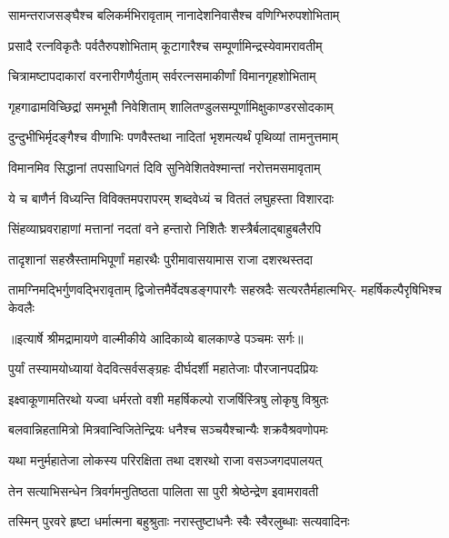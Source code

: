 \twolineshloka
{सामन्तराजसङ्घैश्च बलिकर्मभिरावृताम्}
{नानादेशनिवासैश्च वणिग्भिरुपशोभिताम्} %

\twolineshloka
{प्रसादै रत्नविकृतैः पर्वतैरुपशोभिताम्}
{कूटागारैश्च सम्पूर्णामिन्द्रस्येवामरावतीम्} %

\twolineshloka
{चित्रामष्टापदाकारां वरनारीगणैर्युताम्}
{सर्वरत्नसमाकीर्णां विमानगृहशोभिताम्} %

\twolineshloka
{गृहगाढामविच्छिद्रां समभूमौ निवेशिताम्}
{शालितण्डुलसम्पूर्णामिक्षुकाण्डरसोदकाम्} %

\twolineshloka
{दुन्दुभीभिर्मृदङ्गैश्च वीणाभिः पणवैस्तथा}
{नादितां भृशमत्यर्थं पृथिव्यां तामनुत्तमाम्} %

\twolineshloka
{विमानमिव सिद्धानां तपसाधिगतं दिवि}
{सुनिवेशितवेश्मान्तां नरोत्तमसमावृताम्} %

\twolineshloka
{ये च बाणैर्न विध्यन्ति विविक्तमपरापरम्}
{शब्दवेध्यं च विततं लघुहस्ता विशारदाः} %

\twolineshloka
{सिंहव्याघ्रवराहाणां मत्तानां नदतां वने}
{हन्तारो निशितैः शस्त्रैर्बलाद्बाहुबलैरपि} %

\twolineshloka
{तादृशानां सहस्रैस्तामभिपूर्णां महारथैः}
{पुरीमावासयामास राजा दशरथस्तदा} %

\fourlineindentedshloka
{तामग्निमद्भिर्गुणवद्भिरावृताम्}
{द्विजोत्तमैर्वेदषडङ्गपारगैः}
{सहस्रदैः सत्यरतैर्महात्मभिर्-}
{महर्षिकल्पैरृषिभिश्च केवलैः} %


{॥इत्यार्षे श्रीमद्रामायणे वाल्मीकीये आदिकाव्ये बालकाण्डे पञ्चमः सर्गः॥}


\twolineshloka
{पुर्यां तस्यामयोध्यायां वेदवित्सर्वसङ्ग्रहः}
{दीर्घदर्शी महातेजाः पौरजानपदप्रियः} %

\twolineshloka
{इक्ष्वाकूणामतिरथो यज्वा धर्मरतो वशी}
{महर्षिकल्पो राजर्षिस्त्रिषु लोकृषु विश्रुतः} %

\twolineshloka
{बलवान्निहतामित्रो मित्रवान्विजितेन्द्रियः}
{धनैश्च सञ्चयैश्चान्यैः शक्रवैश्रवणोपमः} %

\twolineshloka
{यथा मनुर्महातेजा लोकस्य परिरक्षिता}
{तथा दशरथो राजा वसञ्जगदपालयत्} %

\twolineshloka
{तेन सत्याभिसन्धेन त्रिवर्गमनुतिष्ठता}
{पालिता सा पुरी श्रेष्ठेन्द्रेण इवामरावती} %

\twolineshloka
{तस्मिन् पुरवरे हृष्टा धर्मात्मना बहुश्रुताः}
{नरास्तुष्टाधनैः स्वैः स्वैरलुब्धाः सत्यवादिनः} %

